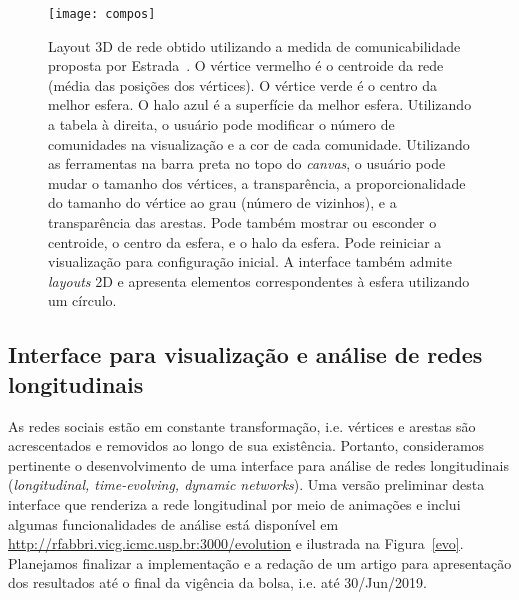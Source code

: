 \documentclass[a4paper, 11pt]{article}
\begin{document}
\begin{figure}[h!]
\centering
  \texttt{[image: compos]}
\caption{%
  Layout 3D de rede obtido utilizando a medida de comunicabilidade proposta por Estrada~\cite{ern2,ern3}.
  O vértice vermelho é o centroide da rede (média das posições
  dos vértices).
  O vértice verde é o centro da melhor esfera.
  O halo azul é a superfície da melhor esfera.
  Utilizando a tabela à direita, o usuário pode
  modificar o número de comunidades na visualização
  e a cor de cada comunidade.
  Utilizando as ferramentas na barra preta no topo do \emph{canvas},
  o usuário pode mudar o tamanho dos vértices, a transparência,
  a proporcionalidade do tamanho do vértice ao grau (número de vizinhos),
  e a transparência das arestas.
  Pode também mostrar ou esconder o centroide, o centro da esfera,
  e o halo da esfera.
  Pode reiniciar a visualização para configuração inicial. %
  A interface também admite \emph{layouts} 2D e
  apresenta elementos
  correspondentes à esfera utilizando um círculo.
}\label{com}
\end{figure}


\subsection{Interface para visualização e análise de redes longitudinais}\label{sevo}
As redes sociais estão em constante transformação, i.e. vértices e arestas são
acrescentados e removidos ao longo de sua existência.
Portanto, consideramos pertinente o desenvolvimento de uma interface
para análise de redes longitudinais (\emph{longitudinal, time-evolving, dynamic networks}).
Uma versão preliminar desta interface que renderiza a rede longitudinal por meio de animações e inclui algumas funcionalidades de análise está disponível em \url{http://rfabbri.vicg.icmc.usp.br:3000/evolution} e ilustrada na Figura~\ref{evo}.
Planejamos finalizar a implementação e a redação de um artigo para apresentação dos resultados até o final da vigência da bolsa, i.e. até 30/Jun/2019.
\end{document}
